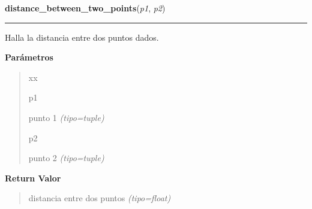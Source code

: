 \hspace{.8\funcindent}\begin{boxedminipage}{\funcwidth}

    \raggedright \textbf{distance\_between\_two\_points}(\textit{p1}, \textit{p2})

    \vspace{-1.5ex}

    \rule{\textwidth}{0.5\fboxrule}
\setlength{\parskip}{2ex}
Halla la distancia entre dos puntos dados.

\setlength{\parskip}{1ex}
      \textbf{Parámetros}
      \vspace{-1ex}

      \begin{quote}
        \begin{Ventry}{xx}

          \item[p1]


punto 1
            {\it (tipo=tuple)}

          \item[p2]


punto 2
            {\it (tipo=tuple)}

        \end{Ventry}

      \end{quote}

      \textbf{Return Valor}
    \vspace{-1ex}

      \begin{quote}

distancia entre dos puntos
      {\it (tipo=float)}

      \end{quote}

    \end{boxedminipage}

    \label{src:functions:direction_between_two_points}

    \vspace{0.5ex}

